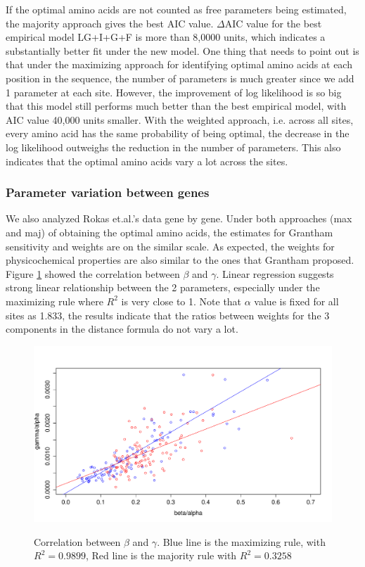 \documentclass[13pt]{article}
\begin{document}
If the optimal amino acids are not counted as free parameters being estimated, the majority approach gives the best AIC value. $\Delta$AIC value for the best empirical model LG+I+G+F is more than 8,0000 units, which indicates a substantially better fit under the new model.
One thing that needs to point out is that under the maximizing approach for identifying optimal amino acids at each position in the sequence, the number of parameters is much greater since we add 1 parameter at each site.
However, the improvement of log likelihood is so big that this model still performs much better than the best empirical model, with AIC value 40,000 units smaller.
With the weighted approach, i.e. across all sites, every amino acid has the same probability of being optimal, the decrease in the log likelihood outweighs the reduction in the number of parameters.
This also indicates that the optimal amino acids vary a lot across the sites.  

\subsubsection{Parameter variation between genes}
We also analyzed Rokas et.al.'s data gene by gene.
Under both approaches  (max and maj) of obtaining the optimal amino acids, the estimates for Grantham sensitivity and weights are on the similar scale.
As expected, the weights for physicochemical properties are also similar to the ones that Grantham proposed.
Figure \ref{fig:correlation} showed the correlation between $\beta$ and $\gamma$.
Linear regression suggests strong linear relationship between the 2 parameters, especially under the maximizing rule where $R^2$ is very close to 1.
Note that $\alpha$ value is fixed for all sites as 1.833, the results indicate that the ratios between weights for the 3 components in the distance formula do not vary a lot.\\

\begin{figure}[h]
\caption{Correlation between $\beta$ and $\gamma$.
Blue line is the maximizing rule, with $R^2 = 0.9899$, Red line is the majority rule with $R^2 = 0.3258$}
\centering
\includegraphics[width=\textwidth]{GMmaxmaj.pdf}
\label{fig:correlation}
\end{figure}
\end{document}

